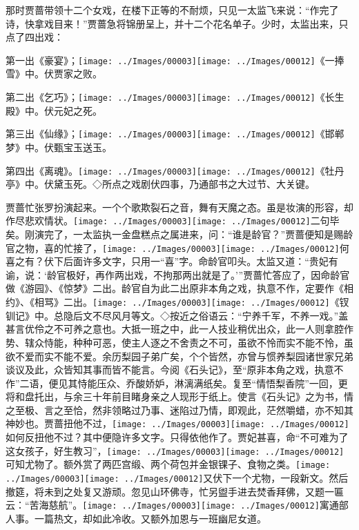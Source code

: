 那时贾蔷带领十二个女戏，在楼下正等的不耐烦，只见一太监飞来说：``作完了诗，快拿戏目来！''贾蔷急将锦册呈上，并十二个花名单子。少时，太监出来，只点了四出戏：

第一出《豪宴》；{\texttt{[image: ../Images/00003]}\texttt{[image: ../Images/00012]}\footnotesize \kaishu 《一捧雪》中。伏贾家之败。}

第二出《乞巧》；{\texttt{[image: ../Images/00003]}\texttt{[image: ../Images/00012]}\footnotesize \kaishu 《长生殿》中。伏元妃之死。}

第三出《仙缘》；{\texttt{[image: ../Images/00003]}\texttt{[image: ../Images/00012]}\footnotesize \kaishu 《邯郸梦》中。伏甄宝玉送玉。}

第四出《离魂》。{\texttt{[image: ../Images/00003]}\texttt{[image: ../Images/00012]}\footnotesize \kaishu 《牡丹亭》中。伏黛玉死。◇所点之戏剧伏四事，乃通部书之大过节、大关键。}

贾蔷忙张罗扮演起来。一个个歌欺裂石之音，舞有天魔之态。虽是妆演的形容，却作尽悲欢情状。{\texttt{[image: ../Images/00003]}\texttt{[image: ../Images/00012]}\footnotesize \kaishu 二句毕矣。}刚演完了，一太监执一金盘糕点之属进来，问：``谁是龄官？''贾蔷便知是赐龄官之物，喜的忙接了，{\texttt{[image: ../Images/00003]}\texttt{[image: ../Images/00012]}\footnotesize \kaishu 何喜之有？伏下后面许多文字，只用一``喜''字。}命龄官叩头。太监又道：``贵妃有谕，说：`龄官极好，再作两出戏，不拘那两出就是了。'''贾蔷忙答应了，因命龄官做《游园》、《惊梦》二出。龄官自为此二出原非本角之戏，执意不作，定要作《相约》、《相骂》二出。{\texttt{[image: ../Images/00003]}\texttt{[image: ../Images/00012]}\footnotesize \kaishu 《钗钏记》中。总隐后文不尽风月等文。◇按近之俗语云：``宁养千军，不养一戏。''盖甚言优伶之不可养之意也。大抵一班之中，此一人技业稍优出众，此一人则拿腔作势、辖众恃能，种种可恶，使主人逐之不舍责之不可，虽欲不怜而实不能不怜，虽欲不爱而实不能不爱。余历梨园子弟广矣，个个皆然，亦曾与惯养梨园诸世家兄弟谈议及此，众皆知其事而皆不能言。今阅《石头记》，至``原非本角之戏，执意不作''二语，便见其恃能压众、乔酸娇妒，淋漓满纸矣。复至``情悟梨香院''一回，更将和盘托出，与余三十年前目睹身亲之人现形于纸上。使言《石头记》之为书，情之至极、言之至恰，然非领略过乃事、迷陷过乃情，即观此，茫然嚼蜡，亦不知其神妙也。}贾蔷扭他不过，{\texttt{[image: ../Images/00003]}\texttt{[image: ../Images/00012]}\footnotesize \kaishu 如何反扭他不过？其中便隐许多文字。}只得依他作了。贾妃甚喜，命``不可难为了这女孩子，好生教习''，{\texttt{[image: ../Images/00003]}\texttt{[image: ../Images/00012]}\footnotesize \kaishu 可知尤物了。}额外赏了两匹宫缎、两个荷包并金银锞子、食物之类。{\texttt{[image: ../Images/00003]}\texttt{[image: ../Images/00012]}\footnotesize \kaishu 又伏下一个尤物，一段新文。}然后撤筵，将未到之处复又游顽。忽见山环佛寺，忙另盥手进去焚香拜佛，又题一匾云：``苦海慈航''。{\texttt{[image: ../Images/00003]}\texttt{[image: ../Images/00012]}\footnotesize \kaishu 寓通部人事。一篇热文，却如此冷收。}又额外加恩与一班幽尼女道。

